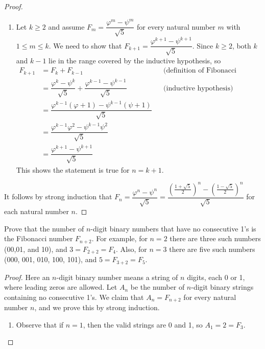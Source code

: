 \documentclass[DIN, pagenumber=false, fontsize=11pt, parskip=half]{scrartcl}
\begin{document}
\begin{problems}
\begin{proof}
\begin{enumerate}
            If $n=2$, then the statement is $F_2 = \dfrac{\varphi^2 - \psi^2}{\sqrt{5}}$. Since $\varphi^2 - \psi^2 = (\varphi + 1) - (\psi + 1) = \varphi - \psi = \sqrt{5}$, the right-hand side equals $1 = F_2$, and the statement is true.

            \item Let $k \geq 2$ and assume $F_m = \dfrac{\varphi^m - \psi^m}{\sqrt{5}}$ for every natural number $m$ with $1 \leq m \leq k$. We need to show that $F_{k+1} = \dfrac{\varphi^{k+1} - \psi^{k+1}}{\sqrt{5}}$. Since $k \geq 2$, both $k$ and $k-1$ lie in the range covered by the inductive hypothesis, so
                \begin{align*}
                    F_{k+1} &= F_k + F_{k-1} && \text{(definition of Fibonacci Sequence)}\\
                            &= \dfrac{\varphi^k - \psi^k}{\sqrt{5}} + \dfrac{\varphi^{k-1} - \psi^{k-1}}{\sqrt{5}} && \text{(inductive hypothesis)}\\
                            &= \dfrac{\varphi^{k-1}(\varphi + 1) - \psi^{k-1}(\psi + 1)}{\sqrt{5}}\\
                            &= \dfrac{\varphi^{k-1}\varphi^2 - \psi^{k-1}\psi^2}{\sqrt{5}}\\
                            &= \dfrac{\varphi^{k+1} - \psi^{k+1}}{\sqrt{5}}
                \end{align*}
                This shows the statement is true for $n = k + 1$.
        \end{enumerate}
        It follows by strong induction that $F_n = \dfrac{\varphi^n - \psi^n}{\sqrt{5}} = \dfrac{\left(\frac{1+\sqrt{5}}{2}\right)^n - \left(\frac{1-\sqrt{5}}{2}\right)^n}{\sqrt{5}}$ for each natural number $n$.
    \end{proof}

    \problem Prove that the number of $n$-digit binary numbers that have no consecutive 1's is the Fibonacci number $F_{n+2}$. For example, for $n=2$ there are three such numbers (00,01, and 10), and $3 = F_{2+2} = F_{4}$. Also, for $n = 3$ there are five such numbers (000, 001, 010, 100, 101), and $5 = F_{3+2} = F_5$.
    \begin{proof}
        Here an $n$-digit binary number means a string of $n$ digits, each 0 or 1, where leading zeros are allowed. Let $A_n$ be the number of $n$-digit binary strings containing no consecutive 1's. We claim that $A_n = F_{n+2}$ for every natural number $n$, and we prove this by strong induction.
        \begin{enumerate}
            \item Observe that if $n=1$, then the valid strings are 0 and 1, so $A_1 = 2 = F_3$.


\end{enumerate}
\end{proof}
\end{problems}
\end{document}
